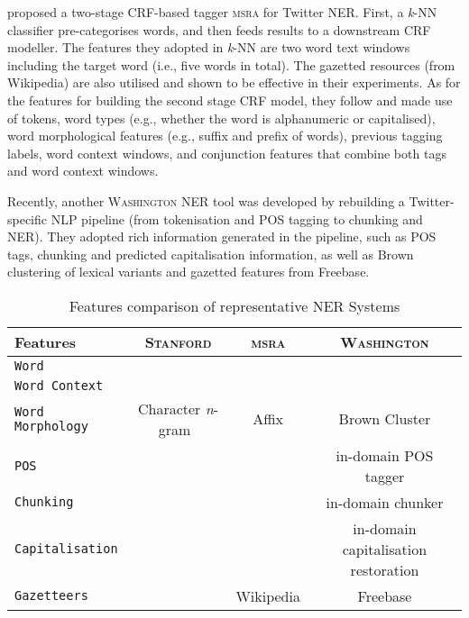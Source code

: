 \documentclass[11pt]{article}
\newcommand{\eg}{e.g.,\xspace}
\newcommand{\ie}{i.e.,\xspace}
\newcommand{\ngram}{\textit{n}-gram\ }
\newcommand{\stanford}{\textsc{Stanford}\xspace}
\newcommand{\washington}{\textsc{Washington}\xspace}
\newcommand{\msra}{\textsc{msra}\xspace}
\newcommand{\feature}[1]{\texttt{#1}\xspace}
\newcommand{\cmark}{\ding{51}}%
\newcommand{\xmark}{\ding{55}}%
\begin{document}
 proposed a two-stage CRF-based tagger \msra for Twitter NER.
First, a \textit{k}-NN classifier pre-categorises words, and then feeds results to a downstream CRF modeller.
The features they adopted in \textit{k}-NN are two word text windows including the target word (\ie five words in total).
The gazetted resources (from Wikipedia) are also utilised and shown to be effective in their experiments.
As for the features for building the second stage CRF model, they follow  and made use of tokens, word types (\eg whether the word is alphanumeric or capitalised), word morphological features (\eg suffix and prefix of words), previous tagging labels, word context windows, and conjunction features that combine both tags and word context windows.


Recently, another \washington NER tool was developed by rebuilding a Twitter-specific NLP pipeline (from tokenisation and POS tagging to chunking and NER).
They adopted rich information generated in the pipeline, such as POS tags, chunking and predicted capitalisation information, as well as Brown clustering of lexical variants and gazetted features from Freebase.

\begin{table*}[!htbp]
\begin{center}
\begin{tabular}{lccc}
\toprule
Features                                     & \stanford & \msra & \washington \\ 
\midrule
\feature{Word}                               & \cmark & \cmark & \cmark \\
\feature{Word Context}                       & \cmark & \cmark & \cmark \\
\feature{Word Morphology}                    & Character \ngram  & Affix & Brown Cluster \\
\feature{POS}                                & \cmark & \xmark & in-domain POS tagger\\
\feature{Chunking}                           & \xmark & \xmark & in-domain chunker \\
\feature{Capitalisation}                     & \xmark & \cmark & in-domain capitalisation restoration\\
\feature{Gazetteers}                         & \xmark & Wikipedia & Freebase \\
\bottomrule
\end{tabular}
\end{center}
\caption{Features comparison of representative NER Systems}
\label{tab:fea_comp}
\end{table*}
\end{document}
